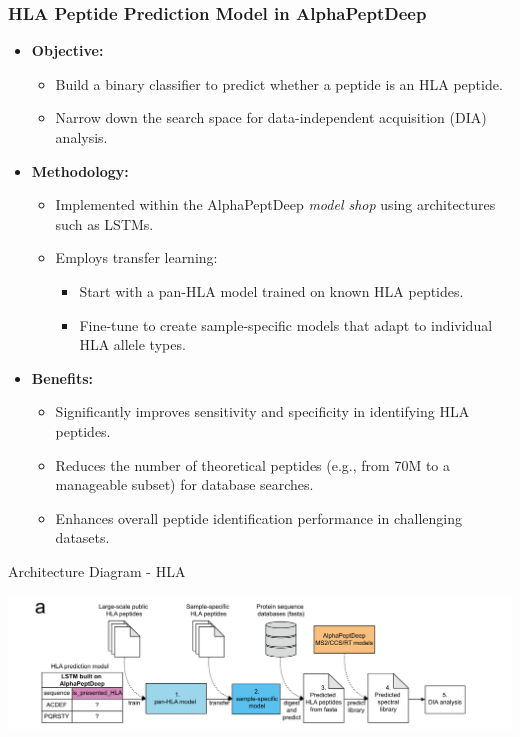 \documentclass{beamer}
\begin{document}
\begin{frame}
  \frametitle{HLA Peptide Prediction Model in AlphaPeptDeep}
  \begin{itemize}
    \item \textbf{Objective:} 
      \begin{itemize}
        \item Build a binary classifier to predict whether a peptide is an HLA peptide.
        \item Narrow down the search space for data-independent acquisition (DIA) analysis.
      \end{itemize}
    \item \textbf{Methodology:}
      \begin{itemize}
        \item Implemented within the AlphaPeptDeep \textit{model shop} using architectures such as LSTMs.
        \item Employs transfer learning:
          \begin{itemize}
            \item Start with a pan-HLA model trained on known HLA peptides.
            \item Fine-tune to create sample-specific models that adapt to individual HLA allele types.
          \end{itemize}
      \end{itemize}
    \item \textbf{Benefits:}
      \begin{itemize}
        \item Significantly improves sensitivity and specificity in identifying HLA peptides.
        \item Reduces the number of theoretical peptides (e.g., from 70M to a manageable subset) for database searches.
        \item Enhances overall peptide identification performance in challenging datasets.
      \end{itemize}
 
  \end{itemize}
\end{frame}

\begin{frame}{Architecture Diagram - HLA}
 \begin{center}
    \includegraphics[width=\textwidth]{Screenshot from 2025-03-12 20-32-25.png}
  \end{center}
  \end{frame}
\end{document}
